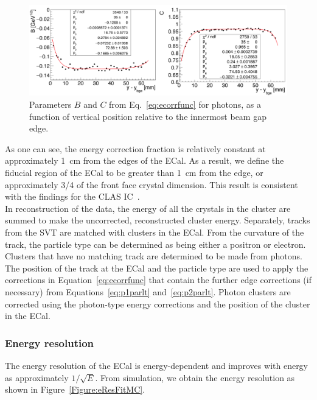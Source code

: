\begin{figure}[htb]
  \centering
      \includegraphics[width=1.0\textwidth]{pics/performance/sfparEdge_p.png}
  \caption[ECal energy shower parameters for photons relative to the inside beam gap edge]{Parameters $B$ and $C$ from Eq.~\ref{eq:ecorrfunc} for photons, as a function of vertical position
relative to the innermost beam gap edge.}
  \label{Figure:sfparEdgeP}
\end{figure}

As one can see, the energy correction fraction is relatively constant at approximately 1~cm from the edges of the ECal. As a result, we define the fiducial region of the ECal to be greater than 1~cm from the edge, or approximately 3/4 of the front face crystal dimension. This result is consistent with the findings for the CLAS IC~\cite{szumila-vance_hps_ecal_2014}.\\
\indent In reconstruction of the data, the energy of all the crystals in the cluster are summed to make the uncorrected, reconstructed cluster energy. Separately, tracks from the SVT are matched with clusters in the ECal. From the curvature of the track, the particle type can be determined as being either a positron or electron. Clusters that have no matching track are determined to be made from photons. The position of the track at the ECal and the particle type are used to apply the corrections in Equation~\eqref{eq:ecorrfunc} that contain the further edge corrections (if necessary) from Equations~\eqref{eq:p1parlt} and~\eqref{eq:p2parlt}. Photon clusters are corrected using the photon-type energy corrections and the position of the cluster in the ECal.  

\subsubsection{Energy resolution}

The energy resolution of the ECal is energy-dependent and improves with energy as approximately $1/\sqrt{E}$. From simulation, we obtain the energy resolution as shown in Figure~\ref{Figure:eResFitMC}.\\

